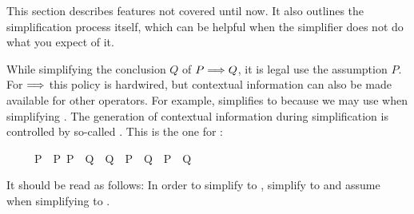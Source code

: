 %
\begin{isabellebody}%
\def\isabellecontext{simp}%
%
%
\begin{isamarkuptext}%
\label{sec:simplification-II}
This section describes features not covered until now.  It also
outlines the simplification process itself, which can be helpful
when the simplifier does not do what you expect of it.%
\end{isamarkuptext}%
%
%
%
\begin{isamarkuptext}%
\label{sec:simp-cong}
While simplifying the conclusion $Q$
of $P \Longrightarrow Q$, it is legal use the assumption $P$.
For $\Longrightarrow$ this policy is hardwired, but 
contextual information can also be made available for other
operators. For example,  simplifies to  because we may use  when simplifying . The generation of contextual information during simplification is
controlled by so-called . This is the one for
\isa{{\isasymlongrightarrow}}:
\begin{isabelle}%
\ \ \ \ \ {\isasymlbrakk}P\ {\isacharequal}\ P{\isacharprime}{\isacharsemicolon}\ P{\isacharprime}\ {\isasymLongrightarrow}\ Q\ {\isacharequal}\ Q{\isacharprime}{\isasymrbrakk}\ {\isasymLongrightarrow}\ {\isacharparenleft}P\ {\isasymlongrightarrow}\ Q{\isacharparenright}\ {\isacharequal}\ {\isacharparenleft}P{\isacharprime}\ {\isasymlongrightarrow}\ Q{\isacharprime}{\isacharparenright}%
\end{isabelle}
It should be read as follows:
In order to simplify  to ,
simplify  to 
and assume  when simplifying  to .


\end{isamarkuptext}
\end{isabellebody}
